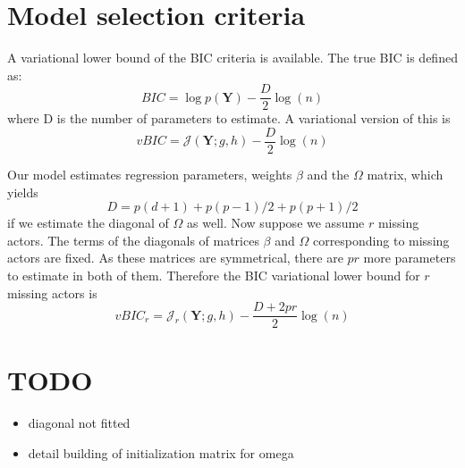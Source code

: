 \documentclass[11pt,a4paper]{article}
\newcommand{\Ybf}{\boldsymbol{Y}}
\newcommand{\bound}{\mathcal{J}}
\begin{document}
\section{Model selection criteria}

A variational lower bound of the BIC criteria is available. The true BIC is defined as:
$$ BIC = \log p(\Ybf) - \frac{D}{2} \log(n) $$
where D is the number of parameters to estimate. A variational version of this is 
$$vBIC = \bound(\Ybf; g,h) - \frac{D}{2} \log(n)  $$

Our model estimates regression parameters, weights $\beta$ and the $\Omega$ matrix, which yields
$$D = p(d+1) + p(p-1)/2 + p(p+1)/2 $$
if we estimate the diagonal of $\Omega$ as well.
Now suppose we assume $r$ missing actors. The terms of the diagonals of matrices $\beta$ and $\Omega$ corresponding to missing actors are fixed. As these matrices are symmetrical,  there are $pr$ more parameters to estimate in both of them. Therefore the BIC variational lower bound for $r$ missing actors is
$$ vBIC_r=\bound_r(\Ybf; g,h) - \frac{D+2pr}{2} \log(n)  $$
\section{TODO}
 \begin{itemize}
 \item diagonal not fitted
 \item detail building of initialization matrix for omega
 \end{itemize}

\newpage

\end{document}
